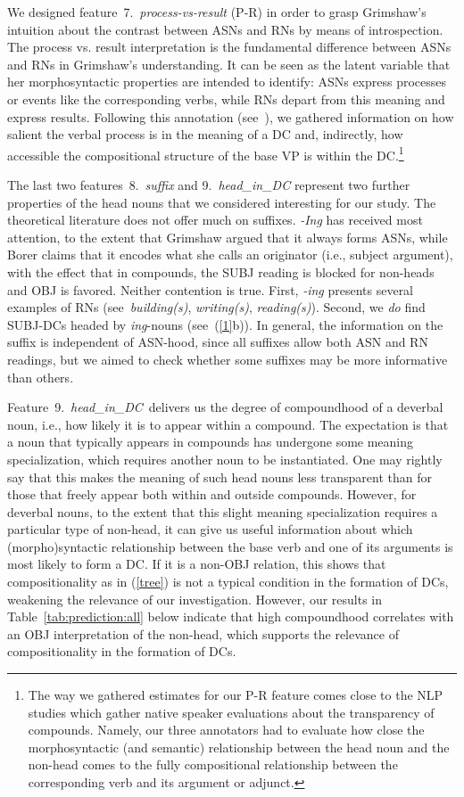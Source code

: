 \documentclass[output=paper]{langsci/langscibook}
\begin{document}
We designed feature~7.~\textit{process-vs-result} (P-R) in order to grasp Grimshaw's intuition about the contrast between ASNs and RNs by means of introspection. The process vs. result interpretation is  the fundamental difference between ASNs and RNs in Grimshaw's understanding.   It can be seen as the latent variable that her morphosyntactic properties are intended to identify: ASNs express processes or events like the corresponding verbs, while RNs depart from this meaning and express results. Following this annotation (see~), we gathered information on how salient the verbal process is in the meaning of a DC and, indirectly, how accessible the compositional structure of the base VP is within the DC.\footnote{The way we gathered estimates for our P-R feature comes close to the NLP studies which gather native speaker evaluations about the transparency of compounds. Namely, our three annotators had to evaluate how close the morphosyntactic (and semantic) relationship between the head noun and the non-head comes to the fully compositional relationship between the corresponding verb and its argument or adjunct.}


The last two features~8.~\textit{suffix} and 9.~\textit{head\_in\_DC} represent two further properties of the head nouns that we considered interesting for our study. The theoretical literature does not offer much on suffixes. \textit{-Ing} has received most attention, to the extent that Grimshaw argued that it always forms ASNs, while Borer claims that it encodes  {what she calls an} originator (i.e., subject argument), with the effect that in compounds, the SUBJ reading is blocked for non-heads and OBJ is favored. Neither contention is true. First, \textit{-ing} presents several examples of RNs (see~\textit{building(s)}, \textit{writing(s)}, \textit{reading(s)}).
Second, we \textit{do} find SUBJ-DCs headed by \textit{ing}-nouns (see~(\ref{1}b)). In general, the information on the suffix is independent of ASN-hood, since all suffixes allow both ASN and RN readings, but we aimed to check whether some suffixes may be more informative than others. 


Feature~9.~\textit{head\_in\_DC}~delivers us the degree of compoundhood of a deverbal noun, i.e., how likely it is to appear within a compound.
The expectation is that a noun that typically appears in compounds has undergone some meaning specialization, which requires another noun to be instantiated. One may rightly say that this makes the meaning of such head nouns less transparent than for those that freely appear both within and outside compounds. However, for deverbal nouns, to the extent that this slight meaning specialization requires a particular type of non-head, it can give us useful information about which (morpho)syntactic relationship between the base verb and one of its arguments is most likely to form a DC. If it is a non-OBJ relation, this shows that compositionality as in (\ref{tree}) is not a typical condition in the formation of DCs, weakening the relevance of our investigation. However, our results 
in Table~\ref{tab:prediction:all} below indicate that high compoundhood correlates with an OBJ interpretation of the non-head, which supports the relevance of compositionality in the formation of DCs.
\end{document}
